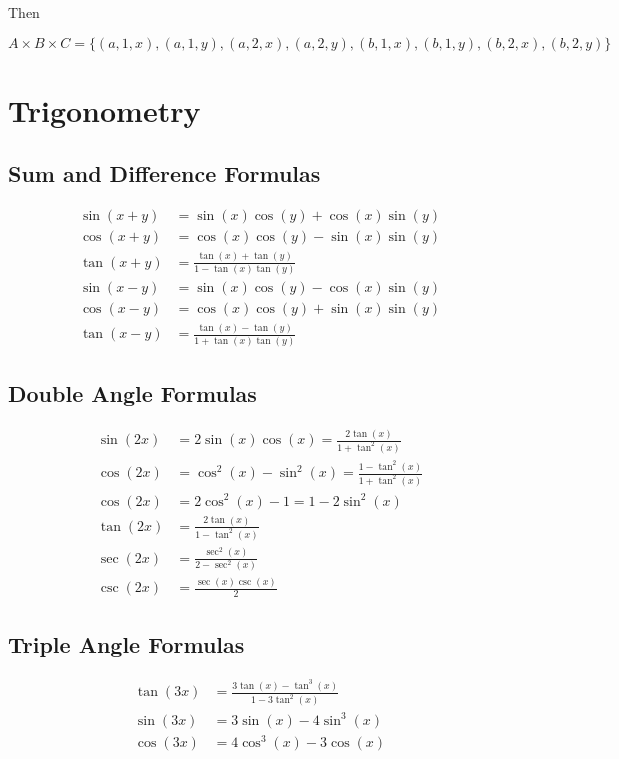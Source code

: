 \documentclass{article}
\begin{document}
Then

\[
A \times B \times C = \{(a, 1, x), (a, 1, y), (a, 2, x), (a, 2, y), (b, 1, x), (b, 1, y), (b, 2, x), (b, 2, y)\}
\]

\section{Trigonometry}

\subsection{Sum and Difference Formulas}

\begin{align}
\sin(x+y) &= \sin(x)\cos(y) + \cos(x)\sin(y) \\
\cos(x+y) &= \cos(x)\cos(y) - \sin(x)\sin(y) \\
\tan(x+y) &= \frac{\tan(x)+\tan(y)}{1-\tan(x)\tan(y)} \\
\sin(x-y) &= \sin(x)\cos(y) - \cos(x)\sin(y) \\
\cos(x-y) &= \cos(x)\cos(y) + \sin(x)\sin(y) \\
\tan(x-y) &= \frac{\tan(x)-\tan(y)}{1+\tan(x)\tan(y)}
\end{align}

\subsection{Double Angle Formulas}

\begin{align}
\sin(2x) &= 2\sin(x)\cos(x) = \frac{2\tan(x)}{1+\tan^2(x)} \\
\cos(2x) &= \cos^2(x) - \sin^2(x) = \frac{1-\tan^2(x)}{1+\tan^2(x)} \\
\cos(2x) &= 2\cos^2(x) - 1 = 1 - 2\sin^2(x) \\
\tan(2x) &= \frac{2\tan(x)}{1-\tan^2(x)} \\
\sec(2x) &= \frac{\sec^2(x)}{2-\sec^2(x)} \\
\csc(2x) &= \frac{\sec(x)\csc(x)}{2}
\end{align}

\subsection{Triple Angle Formulas}

\begin{align}
\tan(3x) &= \frac{3\tan(x)-\tan^3(x)}{1-3\tan^2(x)} \\
\sin(3x) &= 3\sin(x)-4\sin^3(x) \\
\cos(3x) &= 4\cos^3(x)-3\cos(x)
\end{align}
\end{document}
